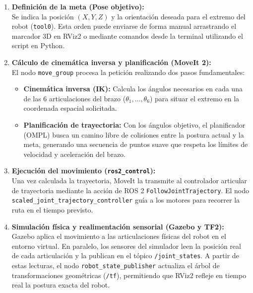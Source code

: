 \documentclass[11pt,a4paper]{article}
\begin{document}
\begin{enumerate}
    \item \textbf{Definición de la meta (Pose objetivo):}\\
    Se indica la posición $(X, Y, Z)$ y la orientación deseada para el extremo del robot (\texttt{tool0}). Esta orden puede enviarse de forma manual arrastrando el marcador 3D en RViz2 o mediante comandos desde la terminal utilizando el script en Python.

    \item \textbf{Cálculo de cinemática inversa y planificación (MoveIt 2):}\\
    El nodo \texttt{move\_group} procesa la petición realizando dos pasos fundamentales:
    \begin{itemize}
        \item \textbf{Cinemática inversa (IK):} Calcula los ángulos necesarios en cada una de las 6 articulaciones del brazo ($\theta_1, \dots, \theta_6$) para situar el extremo en la coordenada espacial solicitada.
        \item \textbf{Planificación de trayectoria:} Con los ángulos objetivo, el planificador (OMPL) busca un camino libre de colisiones entre la postura actual y la meta, generando una secuencia de puntos suave que respeta los límites de velocidad y aceleración del brazo.
    \end{itemize}

    \item \textbf{Ejecución del movimiento (\texttt{ros2\_control}):}\\
    Una vez calculada la trayectoria, MoveIt la transmite al controlador articular de trayectoria mediante la acción de ROS 2 \texttt{FollowJointTrajectory}. El nodo \texttt{scaled\_joint\_}\-\texttt{trajectory\_controller} guía a los motores para recorrer la ruta en el tiempo previsto.

    \item \textbf{Simulación física y realimentación sensorial (Gazebo y TF2):}\\
    Gazebo aplica el movimiento a las articulaciones físicas del robot en el entorno virtual. En paralelo, los sensores del simulador leen la posición real de cada articulación y la publican en el tópico \texttt{/joint\_states}. A partir de estas lecturas, el nodo \texttt{robot\_state\_publisher} actualiza el árbol de transformaciones geométricas (\texttt{/tf}), permitiendo que RViz2 refleje en tiempo real la postura exacta del robot.
\end{enumerate}
\end{document}
